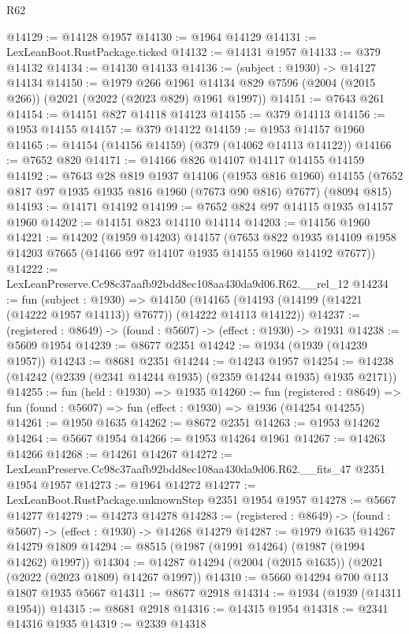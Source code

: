 \begin{lexlean}{R62}
\begin{coremodule}
@14129 := @14128 @1957
@14130 := @1964 @14129
@14131 := LexLeanBoot.RustPackage.ticked
@14132 := @14131 @1957
@14133 := @379 @14132
@14134 := @14130 @14133
@14136 := (subject : @1930) -> @14127 @14134
@14150 := @1979
    @266
    @1961
    @14134
    @829
    @7596
    (@2004 (@2015 @266))
    (@2021 (@2022 (@2023 @829) @1961 @1997))
@14151 := @7643 @261
@14154 := @14151 @827 @14118 @14123
@14155 := @379 @14113
@14156 := @1953 @14155
@14157 := @379 @14122
@14159 := @1953 @14157 @1960
@14165 := @14154 (@14156 @14159) (@379 (@14062 @14113 @14122))
@14166 := @7652 @820
@14171 := @14166 @826 @14107 @14117 @14155 @14159
@14192 := @7643
    @28
    @819
    @1937
    @14106
    (@1953 @816 @1960)
    @14155
    (@7652 @817 @97 @1935 @1935 @816 @1960 (@7673 @90 @816) @7677)
    (@8094 @815)
@14193 := @14171 @14192
@14199 := @7652 @824 @97 @14115 @1935 @14157 @1960
@14202 := @14151 @823 @14110 @14114
@14203 := @14156 @1960
@14221 := @14202
    (@1959 @14203)
    @14157
    (@7653 @822 @1935 @14109 @1958 @14203 @7665 (@14166 @97 @14107 @1935 @14155 @1960 @14192 @7677))
@14222 := LexLeanPreserve.Cc98c37aafb92bdd8ec108aa430da9d06.R62.__rel_12
@14234 := fun (subject : @1930) =>
  @14150 (@14165 (@14193 (@14199 (@14221 (@14222 @1957 @14113)) @7677)) (@14222 @14113 @14122))
@14237 := (registered : @8649) -> (found : @5607) -> (effect : @1930) -> @1931
@14238 := @5609 @1954
@14239 := @8677 @2351
@14242 := @1934 (@1939 (@14239 @1957))
@14243 := @8681 @2351
@14244 := @14243 @1957
@14254 := @14238 (@14242 (@2339 (@2341 @14244 @1935) (@2359 @14244 @1935) @1935 @2171))
@14255 := fun (held : @1930) => @1935
@14260 := fun (registered : @8649) =>
  fun (found : @5607) => fun (effect : @1930) => @1936 (@14254 @14255)
@14261 := @1950 @1635
@14262 := @8672 @2351
@14263 := @1953 @14262
@14264 := @5667 @1954
@14266 := @1953 @14264 @1961
@14267 := @14263 @14266
@14268 := @14261 @14267
@14272 := LexLeanPreserve.Cc98c37aafb92bdd8ec108aa430da9d06.R62.__fits_47 @2351 @1954 @1957
@14273 := @1964 @14272
@14277 := LexLeanBoot.RustPackage.unknownStep @2351 @1954 @1957
@14278 := @5667 @14277
@14279 := @14273 @14278
@14283 := (registered : @8649) -> (found : @5607) -> (effect : @1930) -> @14268 @14279
@14287 := @1979 @1635 @14267 @14279 @1809
@14294 := @8515 (@1987 (@1991 @14264) (@1987 (@1994 @14262) @1997))
@14304 := @14287 @14294 (@2004 (@2015 @1635)) (@2021 (@2022 (@2023 @1809) @14267 @1997))
@14310 := @5660 @14294 @700 @113 @1807 @1935 @5667
@14311 := @8677 @2918
@14314 := @1934 (@1939 (@14311 @1954))
@14315 := @8681 @2918
@14316 := @14315 @1954
@14318 := @2341 @14316 @1935
@14319 := @2339 @14318

\end{coremodule}
\end{lexlean}

